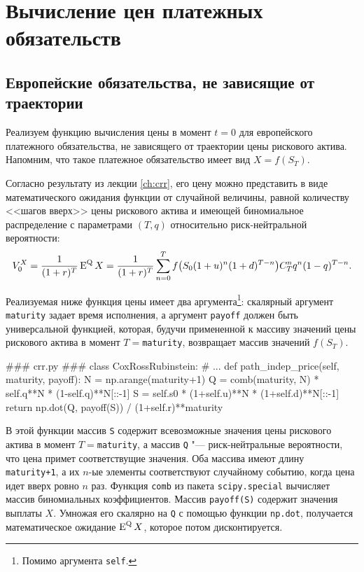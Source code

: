 \section{Вычисление цен платежных обязательств}
\subsection{Европейские обязательства, не зависящие от траектории}
Реализуем функцию вычисления цены в момент $t=0$ для европейского платежного обязательства, не зависящего от траектории цены рискового актива. Напомним, что такое платежное обязательство имеет вид $X=f(S_T)$.

Согласно результату из лекции \ref{ch:crr}, его цену можно представить в виде математического ожидания функции от случайной величины, равной количеству <<шагов вверх>> цены рискового актива и имеющей биномиальное распределение с параметрами $(T,q)$ относительно риск-нейтральной вероятности:
\[
V_0^X = \frac{1}{(1+r)^T}\operatorname{E}^{\mathrm{Q}} X = \frac{1}{(1+r)^T} \sum_{n=0}^T f\bigl(S_0(1+u)^n(1+d)^{T-n}\bigr) C_T^n q^n (1-q)^{T-n}.
\]

Реализуемая ниже функция цены имеет два аргумента\footnote{Помимо аргумента \verb"self".}: скалярный аргумент \verb"maturity" задает время исполнения, а аргумент \verb"payoff" должен быть универсальной функцией, которая, будучи примененной к массиву значений цены рискового актива в момент $T=$\;\verb"maturity", возвращает массив значений $f(S_T)$. 
\begin{python}
### crr.py ###
class CoxRossRubinstein:
    # ...
    def path_indep_price(self, maturity, payoff):
        N = np.arange(maturity+1)
        Q = comb(maturity, N) * self.q**N * (1-self.q)**N[::-1]
        S = self.s0 * (1+self.u)**N * (1+self.d)**N[::-1]
        return np.dot(Q, payoff(S)) / (1+self.r)**maturity
\end{python}

В этой функции массив \verb"S" содержит всевозможные значения цены рискового актива в момент $T=$\;\verb"maturity", а массив \verb"Q" "--- риск-нейтральные вероятности, что цена примет соответствущие значения.
Оба массива имеют длину \verb"maturity+1", а их $n$-ые элементы соответствуют случайному событию, когда цена идет вверх ровно $n$ раз.
Функция \verb"comb" из пакета \verb"scipy.special" вычисляет массив биномиальных коэффициентов. 
Массив \verb"payoff(S)" содержит значения выплаты $X$.
Умножая его скалярно на \verb"Q" с помощью функции \verb"np.dot", получается математическое ожидание $\operatorname{E}^{\mathrm{Q}} X$, которое потом дисконтируется.

